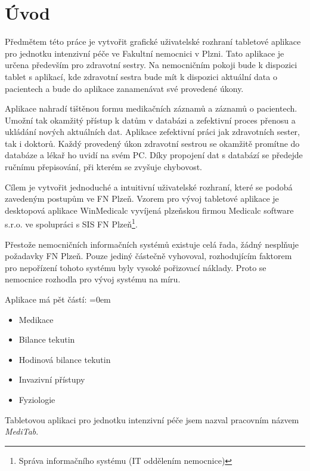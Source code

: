 \chapter*{Úvod}

Předmětem této práce je vytvořit grafické uživatelské rozhraní tabletové aplikace pro jednotku intenzivní péče ve Fakultní nemocnici v Plzni. Tato aplikace je určena především pro zdravotní sestry. Na nemocničním pokoji bude k dispozici tablet s aplikací, kde zdravotní sestra bude mít k dispozici aktuální data o pacientech a bude do aplikace zanamenávat své provedené úkony.

Aplikace nahradí tištěnou formu medikačních záznamů a záznamů o pacientech. Umožní tak okamžitý přístup k datům v databázi a zefektivní proces přenosu a ukládání nových aktuálních dat. Aplikace zefektivní práci jak zdravotních sester, tak i doktorů. Každý provedený úkon zdravotní sestrou se okamžitě promítne do databáze a lékař ho uvidí na svém PC. Díky propojení dat s databází se předejde ručnímu přepisování, při kterém se zvyšuje chybovost.

Cílem je vytvořit jednoduché a intuitivní uživatelské rozhraní, které se podobá zavedeným postupům ve FN Plzeň. Vzorem pro vývoj tabletové aplikace je desktopová aplikace WinMedicalc vyvíjená plzeňskou firmou Medicalc software s.r.o. ve spolupráci s SIS FN Plzeň\footnote{Správa informačního systému (IT oddělením nemocnice)}.

Přestože nemocničních informačních systémů existuje celá řada, žádný nesplňuje požadavky FN Plzeň. Pouze jediný částečně vyhovoval, rozhodujícím faktorem pro nepořízení tohoto systému byly vysoké pořizovací náklady. Proto se nemocnice rozhodla pro vývoj systému na míru.

Aplikace má pět částí:
\parskip=0em
\begin{itemize}
	\item Medikace
	\item Bilance tekutin
	\item Hodinová bilance tekutin
	\item Invazivní přístupy
	\item Fyziologie
\end{itemize}

Tabletovou aplikaci pro jednotku intenzivní péče jsem nazval pracovním názvem \emph{MediTab}.
